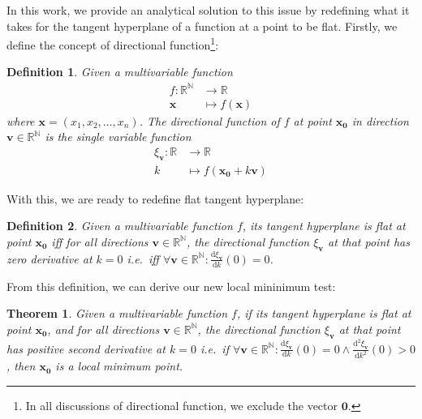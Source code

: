\documentclass[12pt, letterpaper, onside]{article}
\newtheorem{definition}{Definition}[section]
\newtheorem{theorem}{Theorem}[section]
\renewcommand{\vec}{\mathbf}
\begin{document}
In this work, we provide an analytical solution to this issue by redefining what it takes for the tangent hyperplane of a function at a point to be flat. Firstly, we define the concept of directional function\footnote{In all discussions of directional function, we exclude the vector $\vec{0}$.}:
\begin{definition}
    Given a multivariable function
    \begin{align*}
        f \colon \mathbb{R^{N}} & \longrightarrow \mathbb{R}\\
                        \vec{x} & \longmapsto f\left(\vec{x}\right)
    \end{align*}
    where $\vec{x} = \left(x_{1}, x_{2}, \dots, x_{n}\right)$. The directional function of $f$ at point $\vec{x_{0}}$ in direction $\vec{v} \in \mathbb{R^{N}}$ is the single variable function
    \begin{align*}
        \xi_\vec{v} \colon \mathbb{R} & \longrightarrow \mathbb{R}\\
                                    k & \longmapsto f\left(\vec{x_{0}} + k\vec{v}\right)
    \end{align*}
\end{definition}
With this, we are ready to redefine flat tangent hyperplane:
\begin{definition}
    Given a multivariable function $f$, its tangent hyperplane is flat at point $\vec{x_{0}}$ iff for all directions $\vec{v} \in \mathbb{R^{N}}$, the directional function $\xi_\vec{v}$ at that point has zero derivative at $k = 0$ i.e.\ iff $\forall \vec{v} \in \mathbb{R^{N}} \colon \frac{\mathrm{d}\xi_\vec{v}}{\mathrm{d}k}\left(0\right) = 0$.
\end{definition}
From this definition, we can derive our new local mininimum test:
\begin{theorem}
    Given a multivariable function $f$, if its tangent hyperplane is flat at point $\vec{x_{0}}$, and for all directions $\vec{v} \in \mathbb{R^{N}}$, the directional function $\xi_\vec{v}$ at that point has positive second derivative at $k = 0$ i.e.\ if $\forall \vec{v} \in \mathbb{R^{N}} \colon \frac{\mathrm{d}\xi_\vec{v}}{\mathrm{d}k}\left(0\right) = 0 \land \frac{\mathrm{d^2}\xi_\vec{v}}{\mathrm{d}k^2}\left(0\right) > 0$, then $\vec{x_{0}}$ is a local minimum point.
\end{theorem}
\end{document}
